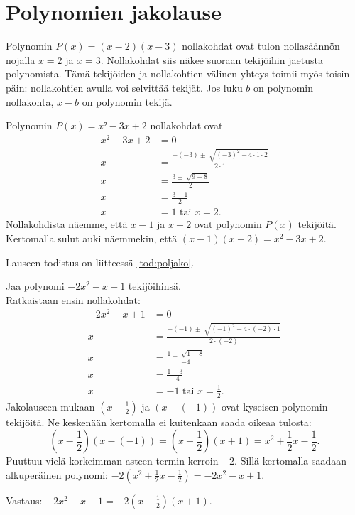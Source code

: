 \section{Polynomien jakolause}

Polynomin $P(x)=(x-2)(x-3)$ nollakohdat ovat tulon nollasäännön nojalla $x=2$ ja $x=3$. Nollakohdat siis näkee suoraan tekijöihin jaetusta polynomista. Tämä tekijöiden ja nollakohtien välinen yhteys toimii myös toisin päin: nollakohtien avulla voi selvittää tekijät. Jos luku $b$ on polynomin nollakohta, $x-b$ on polynomin tekijä.

\begin{esimerkki}
Polynomin $P(x)=x²-3x+2$ nollakohdat ovat
\begin{align*}
x^2-3x+2&=0 \\
x&=\frac{-(-3) \pm \sqrt[]{(-3)^2-4 \cdot 1 \cdot 2}}{2 \cdot 1} \\
x&=\frac{3 \pm \sqrt[]{9-8}}{2} \\
x&=\frac{3 \pm 1}{2} \\
x&=1 \textrm{ tai } x = 2.
\end{align*}
Nollakohdista näemme, että $x-1$ ja $x-2$ ovat polynomin $P(x)$ tekijöitä. Kertomalla sulut auki näemmekin, että $(x-1)(x-2)=x^2-3x+2$.
\end{esimerkki}


Lauseen todistus on liitteessä \ref{tod:poljako}.

\begin{esimerkki}
Jaa polynomi $-2x^2-x+1$ tekijöihinsä.\\
Ratkaistaan ensin nollakohdat:
\begin{align*}
-2x^2-x+1&=0 \\
x&=\frac{-(-1) \pm \sqrt[]{(-1)^2-4 \cdot (-2) \cdot 1}}{2 \cdot (-2)} \\
x&=\frac{1 \pm \sqrt[]{1+8}}{-4} \\
x&=\frac{1 \pm 3}{-4} \\
x&=-1 \textrm{ tai } x = \frac{1}{2}.
\end{align*}
Jakolauseen mukaan $(x-\frac{1}{2})$ ja $(x-(-1))$ ovat kyseisen polynomin tekijöitä.
Ne keskenään kertomalla ei kuitenkaan saada oikeaa tulosta:
$$\left(x-\frac{1}{2}\right)(x-(-1))=\left(x-\frac{1}{2}\right)(x+1)=x^2+\frac{1}{2}x-\frac{1}{2}.$$
Puuttuu vielä korkeimman asteen termin kerroin $-2$. Sillä kertomalla saadaan alkuperäinen polynomi:
$-2(x^2+\frac{1}{2}x-\frac{1}{2})=-2x^2-x+1$.

Vastaus: $-2x^2-x+1 = -2(x-\frac{1}{2})(x+1)$.
\end{esimerkki}

